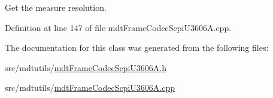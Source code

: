 Get the measure resolution. 



Definition at line 147 of file mdt\-Frame\-Codec\-Scpi\-U3606\-A.\-cpp.



The documentation for this class was generated from the following files\-:\begin{DoxyCompactItemize}
\item 
src/mdtutils/\hyperlink{mdt_frame_codec_scpi_u3606_a_8h}{mdt\-Frame\-Codec\-Scpi\-U3606\-A.\-h}\item 
src/mdtutils/\hyperlink{mdt_frame_codec_scpi_u3606_a_8cpp}{mdt\-Frame\-Codec\-Scpi\-U3606\-A.\-cpp}\end{DoxyCompactItemize}
